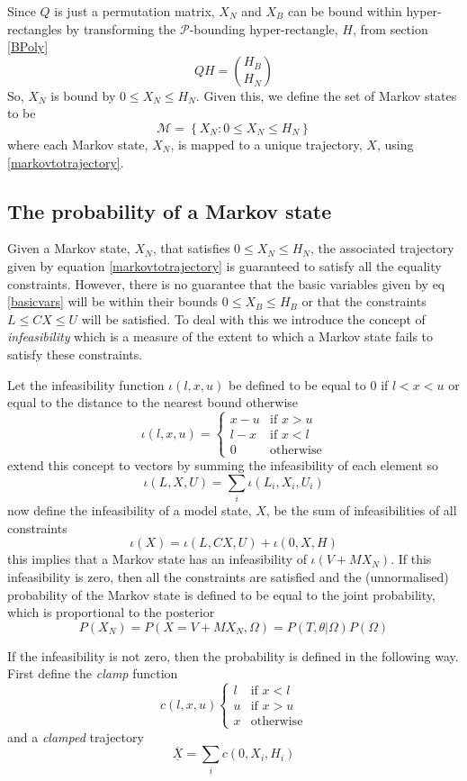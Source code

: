 \documentclass{article}
\begin{document}
Since $Q$ is just a permutation matrix, $X_N$ and $X_B$ can be bound within hyper-rectangles by transforming the $\mathcal{P}$-bounding hyper-rectangle, $H$, from section \ref{BPoly}
\[
QH = {H_B \choose H_N}
\]
So, $X_N$ is bound by $0 \le X_N \le H_N$. Given this, we define the set of Markov states to be
\[
\mathcal{M} = \left\{ X_N: 0 \le X_N \le H_N \right\}
\]
where each Markov state, $X_N$, is mapped to a unique trajectory, $X$, using \eqref{markovtotrajectory}.

\subsection{The probability of a Markov state}

Given a Markov state, $X_N$, that satisfies $0 \le X_N \le H_N$, the associated trajectory given by equation \eqref{markovtotrajectory} is guaranteed to satisfy all the equality constraints. However, there is no guarantee that the basic variables given by eq \eqref{basicvars} will be within their bounds $0 \le X_B \le H_B$ or that the constraints $L \le CX \le U$ will be satisfied. To deal with this we introduce the concept of \textit{infeasibility} which is a measure of the extent to which a Markov state fails to satisfy these constraints.

Let the infeasibility function $\iota(l,x,u)$ be defined to be equal to 0 if $l < x < u$ or equal to the distance to the nearest bound otherwise
\[
\iota(l,x,u) =
\begin{cases}
x-u & \text{if }x>u\\
l-x & \text{if }x<l\\
0 & \text{otherwise}
\end{cases}
\]
extend this concept to vectors by summing the infeasibility of each element so
\[
\iota(L,X,U) = \sum_i \iota(L_i,X_i,U_i)
\]
now define the infeasibility of a model state, $X$, be the sum of infeasibilities of all constraints
\[
\iota(X) = \iota(L, CX, U) + \iota(0, X, H)
\]
this implies that a Markov state has an infeasibility of $\iota(V + MX_N)$. If this infeasibility is zero, then all the constraints are satisfied and the (unnormalised) probability of the Markov state is defined to be equal to the joint probability, which is proportional to the posterior
\[
P(X_N) = P(X=V + MX_N,\Omega) = P(T,\theta|\Omega)P(\Omega)
\]

If the infeasibility is not zero, then the probability is defined in the following way. First define the \textit{clamp} function
\[
c(l,x,u) \begin{cases}
l & \text{if }x<l\\
u & \text{if }x>u\\
x & \text{otherwise}
\end{cases}
\]
and a \textit{clamped} trajectory
\[
\overline{\underline{X}} = \sum_i c(0,X_i,H_i)
\]
\end{document}
